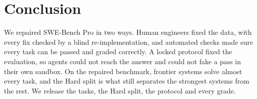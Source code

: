\section{Conclusion}
We repaired SWE-Bench Pro in two ways. Human engineers fixed the data, with every fix checked by a blind re-implementation, and automated checks made sure every task can be passed and graded correctly. A locked protocol fixed the evaluation, so agents could not reach the answer and could not fake a pass in their own sandbox. On the repaired benchmark, frontier systems solve almost every task, and the Hard split is what still separates the strongest systems from the rest. We release the tasks, the Hard split, the protocol and every grade. 
